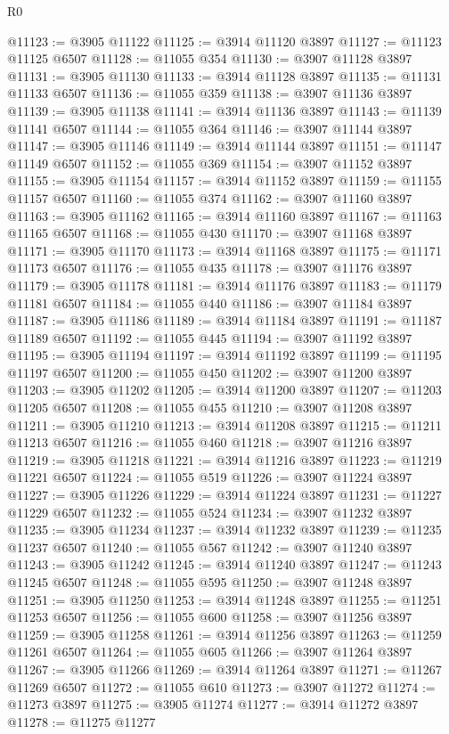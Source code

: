 \begin{lexlean}{R0}
\begin{coremodule}
@11123 := @3905 @11122
@11125 := @3914 @11120 @3897
@11127 := @11123 @11125 @6507
@11128 := @11055 @354
@11130 := @3907 @11128 @3897
@11131 := @3905 @11130
@11133 := @3914 @11128 @3897
@11135 := @11131 @11133 @6507
@11136 := @11055 @359
@11138 := @3907 @11136 @3897
@11139 := @3905 @11138
@11141 := @3914 @11136 @3897
@11143 := @11139 @11141 @6507
@11144 := @11055 @364
@11146 := @3907 @11144 @3897
@11147 := @3905 @11146
@11149 := @3914 @11144 @3897
@11151 := @11147 @11149 @6507
@11152 := @11055 @369
@11154 := @3907 @11152 @3897
@11155 := @3905 @11154
@11157 := @3914 @11152 @3897
@11159 := @11155 @11157 @6507
@11160 := @11055 @374
@11162 := @3907 @11160 @3897
@11163 := @3905 @11162
@11165 := @3914 @11160 @3897
@11167 := @11163 @11165 @6507
@11168 := @11055 @430
@11170 := @3907 @11168 @3897
@11171 := @3905 @11170
@11173 := @3914 @11168 @3897
@11175 := @11171 @11173 @6507
@11176 := @11055 @435
@11178 := @3907 @11176 @3897
@11179 := @3905 @11178
@11181 := @3914 @11176 @3897
@11183 := @11179 @11181 @6507
@11184 := @11055 @440
@11186 := @3907 @11184 @3897
@11187 := @3905 @11186
@11189 := @3914 @11184 @3897
@11191 := @11187 @11189 @6507
@11192 := @11055 @445
@11194 := @3907 @11192 @3897
@11195 := @3905 @11194
@11197 := @3914 @11192 @3897
@11199 := @11195 @11197 @6507
@11200 := @11055 @450
@11202 := @3907 @11200 @3897
@11203 := @3905 @11202
@11205 := @3914 @11200 @3897
@11207 := @11203 @11205 @6507
@11208 := @11055 @455
@11210 := @3907 @11208 @3897
@11211 := @3905 @11210
@11213 := @3914 @11208 @3897
@11215 := @11211 @11213 @6507
@11216 := @11055 @460
@11218 := @3907 @11216 @3897
@11219 := @3905 @11218
@11221 := @3914 @11216 @3897
@11223 := @11219 @11221 @6507
@11224 := @11055 @519
@11226 := @3907 @11224 @3897
@11227 := @3905 @11226
@11229 := @3914 @11224 @3897
@11231 := @11227 @11229 @6507
@11232 := @11055 @524
@11234 := @3907 @11232 @3897
@11235 := @3905 @11234
@11237 := @3914 @11232 @3897
@11239 := @11235 @11237 @6507
@11240 := @11055 @567
@11242 := @3907 @11240 @3897
@11243 := @3905 @11242
@11245 := @3914 @11240 @3897
@11247 := @11243 @11245 @6507
@11248 := @11055 @595
@11250 := @3907 @11248 @3897
@11251 := @3905 @11250
@11253 := @3914 @11248 @3897
@11255 := @11251 @11253 @6507
@11256 := @11055 @600
@11258 := @3907 @11256 @3897
@11259 := @3905 @11258
@11261 := @3914 @11256 @3897
@11263 := @11259 @11261 @6507
@11264 := @11055 @605
@11266 := @3907 @11264 @3897
@11267 := @3905 @11266
@11269 := @3914 @11264 @3897
@11271 := @11267 @11269 @6507
@11272 := @11055 @610
@11273 := @3907 @11272
@11274 := @11273 @3897
@11275 := @3905 @11274
@11277 := @3914 @11272 @3897
@11278 := @11275 @11277

\end{coremodule}
\end{lexlean}
